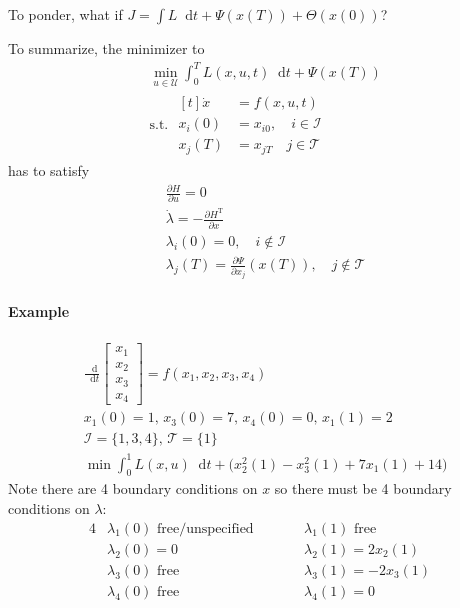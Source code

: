 \documentclass[letterpaper,12pt,titlepage]{report}
\newcommand*\dif{\mathop{}\!\mathrm{d}}
\newcommand{\trans}{^\text{T}}
\newcommand*\pder[2]{\frac{\partial #1}{\partial #2}}
\theoremstyle{plain}
\theoremstyle{definition}
\begin{document}
To ponder, what if $J=\int\! L\dif t + \Psi(x(T)) + \Theta(x(0))$?

To summarize, the minimizer to
\begin{align}
  & \min_{u\in\mathcal U} \int_0^T L(x,u,t)\dif t + \Psi(x(T)) \\
  & \text{s.t. } \begin{aligned}[t]
    \dot x &= f(x,u,t) \\
    x_i(0) &= x_{i0}, \quad i\in\mathcal I \\
    x_j(T) &= x_{jT} \quad j\in\mathcal T
  \end{aligned}
\end{align}
has to satisfy
\begin{align}
  & \pder{H}{u} = 0 \\
  & \dot\lambda = -\pder{H\trans}{x} \\
  & \lambda_i(0) = 0, \quad i\not\in\mathcal I \\
  & \lambda_j(T) = \pder{\Psi}{x_j}(x(T)), \quad j\not\in\mathcal T
\end{align}

\paragraph{Example}
\begin{align}
  & \frac{\dif}{\dif t} \begin{bmatrix}
    x_1 \\ x_2 \\ x_3 \\ x_4
  \end{bmatrix} = f(x_1,x_2,x_3,x_4) \\
  & x_1(0)=1,\, x_3(0)=7,\, x_4(0)=0,\, x_1(1)=2 \\
  & \mathcal I = \{1,3,4\},\, \mathcal T = \{1\} \\
  & \min \int_0^1 L(x,u)\dif t + \big(x_2^2(1) - x_3^2(1) + 7x_1(1) + 14 \big)
\end{align}
Note there are 4 boundary conditions on $x$ so there must be 4 boundary conditions on $\lambda$:
\begin{alignat}{4}
  & \lambda_1(0) \text{ free/unspecified} & \qquad & \lambda_1(1) \text{ free} \\
  & \lambda_2(0) = 0 && \lambda_2(1) = 2x_2(1) \\
  & \lambda_3(0) \text{ free} && \lambda_3(1) = -2x_3(1) \\
  & \lambda_4(0) \text{ free} && \lambda_4(1) = 0
\end{alignat}
\end{document}
